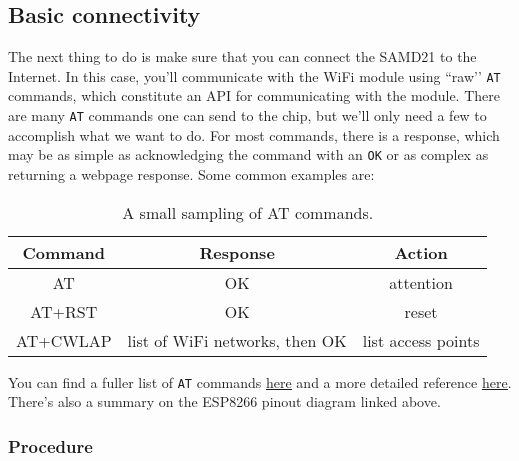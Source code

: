 \documentclass[11pt]{article} %
\begin{document}
\subsection*{Basic connectivity}
The next thing to do is make sure that you can connect the SAMD21 to the Internet. In this case, you’ll communicate with the WiFi module using ``raw’’ \verb|AT| commands, which constitute an API for communicating with the module. There are many \verb|AT| commands one can send to the chip, but we’ll only need a few to accomplish what we want to do. For most commands, there is a response, which may be as simple as acknowledging the command with an \verb|OK|  or as complex as returning a webpage response. Some common examples are:

\begin{table}[htp]
\begin{center}
\begin{tabular}{|c|c|c|}
Command & Response & Action\\
\hline
AT & OK & attention \\
AT+RST & OK & reset \\
AT+CWLAP & list of WiFi networks, then OK & list access points
\end{tabular}
\end{center}
\caption{A small sampling of AT commands.}
\label{default}
\end{table}%

You can find a fuller list of \verb|AT| commands \href{http://www.pridopia.co.uk/pi-doc/ESP8266ATCommandsSet.pdf}{\underline{here}} and a more detailed reference \href{https://www.espressif.com/sites/default/files/documentation/4a-esp8266_at_instruction_set_en.pdf}{\underline{here}}. There’s also a summary on the ESP8266 pinout diagram linked above.

\subsubsection*{Procedure}
\end{document}
